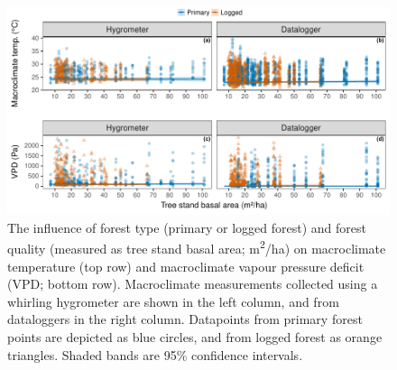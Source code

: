 \documentclass[12pt,a4paper,]{report}
\theoremstyle{definition}
\theoremstyle{definition}
\theoremstyle{definition}
\theoremstyle{remark}
\begin{document}
\begin{figure}[H]

{\centering \includegraphics{./output/fig-B-3-1} 

}

\caption{The influence of forest type (primary or logged forest)
and forest quality (measured as tree stand basal area;
m\textsuperscript{2}/ha) on macroclimate temperature (top row) and
macroclimate vapour pressure deficit (VPD; bottom row). Macroclimate
measurements collected using a whirling hygrometer are shown in the left
column, and from dataloggers in the right column. Datapoints from
primary forest points are depicted as blue circles, and from logged
forest as orange triangles. Shaded bands are 95\% confidence intervals.}\label{fig:fig-B-3}
\end{figure}
\end{document}
